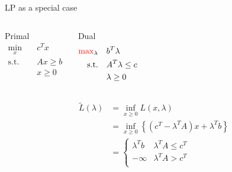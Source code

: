 \documentclass[12pt,notes,mathserif]{beamer}
\newcommand{\red}[1]{ {\color{red}{#1}} }
\begin{document}
\begin{frame}
	{LP as a special case}
	\begin{columns}
		\begin{block}{Primal}
			\begin{equation}
				\begin{aligned}
					\min_x \quad        & c^T x    \\
					\textrm{s.t.} \quad & Ax \ge b \\
					                    & x \ge 0  \\
				\end{aligned}
			\end{equation}
		\end{block}
		\pause
		\begin{block}{Dual}
			\begin{equation}
				\begin{aligned}
					\red{\max}_\lambda \quad        & b^T \lambda       \\
					\textrm{s.t.} \quad & A^T \lambda \le c \\
					                    & \lambda \ge 0     \\
				\end{aligned}
			\end{equation}
		\end{block}
	\end{columns}
	\begin{equation*}
		\begin{aligned}
			\tilde{L}(\lambda) & = \inf_{x \ge 0 } L(x, \lambda)                                           \\
			                   & = \inf_{x \ge 0 } \left\{ (c^T - \lambda^T A ) x + \lambda ^T b  \right\} \\
			                   & = \begin{cases}
				\lambda^T b & \lambda^T A \le c^T \\
				-\infty     & \lambda^T A > c^T   \\
			\end{cases}                                              \\
		\end{aligned}
	\end{equation*}
\end{frame}
\end{document}
